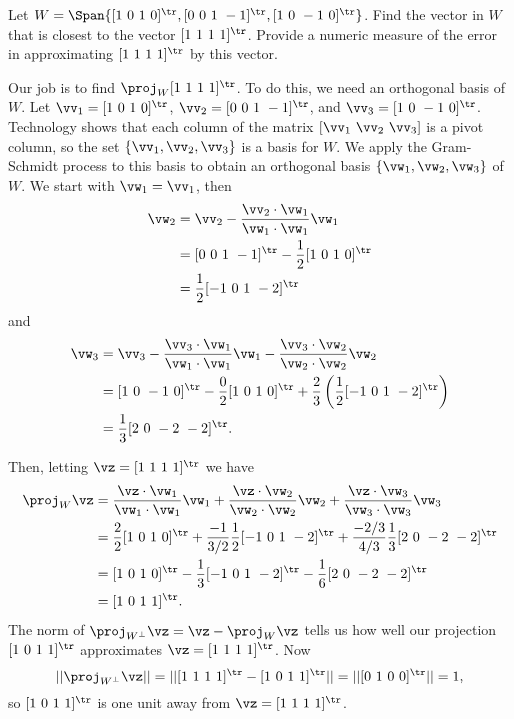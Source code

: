 \begin{example} Let $W = \Span\{[1  \ 0 \ 1 \ 0]^{\tr}, [0 \ 0 \ 1 \ -1]^{\tr}, [1 \ 0 \ -1 \ 0]^{\tr}\}$. Find the vector in $W$ that is closest to the vector $[1 \ 1 \ 1 \ 1]^{\tr}$. Provide a numeric measure of the error in approximating $[1 \ 1 \ 1 \ 1]^{\tr}$ by this vector. 

\ExampleSolution

\ba
\item Our job is to find $\proj_{W} [1 \ 1 \ 1 \ 1]^{\tr}$. To do this, we need an orthogonal basis of $W$. Let $\vv_1 = [1  \ 0 \ 1 \ 0]^{\tr}$, $\vv_2 = [0 \ 0 \ 1 \ -1]^{\tr}$, and $\vv_3 = [1 \ 0 \ -1 \ 0]^{\tr}$. Technology shows that each column of the matrix $[\vv_1 \ \vv_2 \ \vv_3]$ is a pivot column, so the set $\{\vv_1, \vv_2, \vv_3\}$ is a basis for $W$. We apply the Gram-Schmidt process to this basis to obtain an orthogonal basis $\{\vw_1, \vw_2, \vw_3\}$ of $W$. We start with $\vw_1= \vv_1$, then 
\begin{align*}
\vw_2 &= \vv_2 - \frac{\vv_2 \cdot \vw_1}{ \vw_1 \cdot \vw_1} \vw_1  \\
	&= [0 \ 0 \ 1 \ -1]^{\tr} - \frac{1}{2} [1  \ 0 \ 1 \ 0]^{\tr} \\
	&= \frac{1}{2}[-1 \ 0 \ 1 \ -2]^{\tr}
\end{align*}
and
 \begin{align*}
\vw_3 &= \vv_3 - \frac{\vv_3 \cdot \vw_1}{ \vw_1 \cdot \vw_1} \vw_1 - \frac{\vv_3 \cdot \vw_2}{ \vw_2 \cdot \vw_2} \vw_2 \\
	&= [1 \ 0 \ -1 \ 0]^{\tr} - \frac{0}{2} [1  \ 0 \ 1 \ 0]^{\tr} + \frac{2}{3} \left(\frac{1}{2}[-1 \ 0 \ 1 \ -2]^{\tr}\right) \\
	&= \frac{1}{3} [2 \ 0 \ -2 \ -2]^{\tr}.
\end{align*}

Then, letting $\vz = [1 \ 1 \ 1 \ 1]^{\tr}$ we have 
\begin{align*}
\proj_{W} \vz &= \frac{\vz \cdot \vw_1}{\vw_1 \cdot \vw_1} \vw_1 +  \frac{\vz \cdot \vw_2}{\vw_2 \cdot \vw_2} \vw_2 +  \frac{\vz \cdot \vw_3}{\vw_3 \cdot \vw_3} \vw_3 \\
	&= \frac{2}{2}[1  \ 0 \ 1 \ 0]^{\tr} + \frac{-1}{3/2}\frac{1}{2}[-1 \ 0 \ 1 \ -2]^{\tr} + \frac{-2/3}{4/3}  \frac{1}{3} [2 \ 0 \ -2 \ -2]^{\tr} \\
	&= [1  \ 0 \ 1 \ 0]^{\tr} - \frac{1}{3}[-1 \ 0 \ 1 \ -2]^{\tr} - \frac{1}{6}[2 \ 0 \ -2 \ -2]^{\tr} \\
	&= [1 \ 0 \ 1 \ 1]^{\tr}.
\end{align*}
The norm of $\proj_{W^{\perp}} \vz = \vz - \proj_W \vz$ tells us how well our projection $[1 \ 0 \ 1 \ 1]^{\tr}$ approximates $\vz = [1 \ 1 \ 1 \ 1]^{\tr}$. Now
\[||\proj_{W^{\perp}} \vz || = ||[1 \ 1 \ 1 \ 1]^{\tr} - [1 \ 0 \ 1 \ 1]^{\tr}|| = ||[0 \ 1 \ 0 \ 0]^{\tr}|| = 1,\]
so $[1 \ 0 \ 1 \ 1]^{\tr}$ is one unit away from $\vz = [1 \ 1 \ 1 \ 1]^{\tr}$.

\ea

\end{example}

